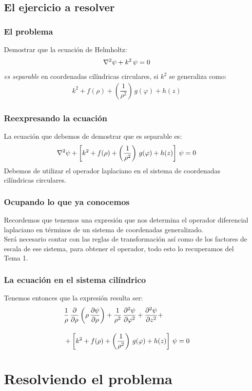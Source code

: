 \documentclass[12pt]{beamer}
\begin{document}
\subsection{El ejercicio a resolver}

\begin{frame}
\frametitle{El problema}
Demostrar que la ecuación de Helmholtz:
\begin{align*}
\laplacian{\psi} + k^{2} \, \psi = 0
\end{align*}
\emph{es separable} en coordenadas cilíndricas circulares, \pause si $k^{2}$ se generaliza como:
\pause
\begin{align*}
k^{2} + f(\rho) + \left( \dfrac{1}{\rho^{2}} \right) \, g(\varphi) + h(z)
\end{align*}
\end{frame}
\begin{frame}
\frametitle{Reexpresando la ecuación}
La ecuación que debemos de demostrar que es separable es:
\begin{align*}
\laplacian{\psi} + \left[ k^{2} + f(\rho) + \left( \dfrac{1}{\rho^{2}} \right) \, g(\varphi) + h(z) \right] \, \psi = 0
\end{align*}
\pause
Debemos de utilizar el operador laplaciano en el sistema de coordenadas cilíndricas circulares.
\end{frame}
\begin{frame}
\frametitle{Ocupando lo que ya conocemos}
Recordemos que tenemos una expresión que nos determina el operador diferencial laplaciano en términos de un sistema de coordenadas generalizado.
\\
\bigskip
\pause
Será necesario contar con las reglas de transformación así como de los factores de escala de ese sistema, para obtener el operador, todo esto lo recuperamos del Tema 1.
\end{frame}
\begin{frame}
\frametitle{La ecuación en el sistema cilíndrico}
Tenemos entonces que la expresión resulta ser:
\pause
\begin{align*}
&{} \dfrac{1}{\rho} \, \pdv{\rho} \left( \rho \, \pdv{\psi}{\rho} \right) + \dfrac{1}{\rho^{2}} \, \pdv[2]{\psi}{\varphi} + \pdv[2]{\psi}{z} + \\[1em]
&+ \left[ k^{2} + f(\rho) + \left( \dfrac{1}{\rho^{2}} \right) \, g(\varphi) + h(z) \right] \, \psi = 0
\end{align*}
\end{frame}

\section{Resolviendo el problema}
\end{document}
